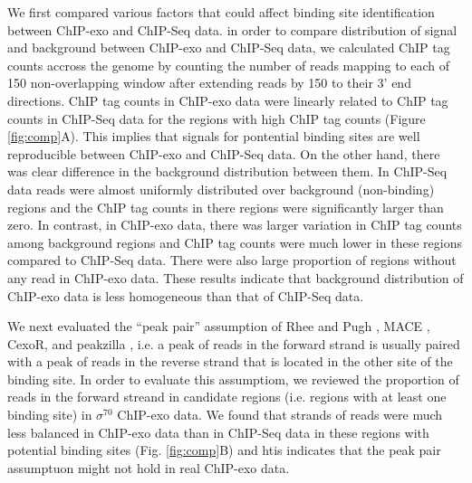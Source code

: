 \documentclass{bmcart}\usepackage[]{graphicx}\usepackage[]{color}
\begin{document}
We first compared various factors that could affect binding site
identification between ChIP-exo and ChIP-Seq data. in order to compare
distribution of signal and background between ChIP-exo and ChIP-Seq
data, we calculated ChIP tag counts accross the genome by counting the
number of reads mapping to each of 150 non-overlapping
window after extending reads by 150 to their 3' end
directions. ChIP tag counts in ChIP-exo data were linearly related to
ChIP tag counts in ChIP-Seq data for the regions with high ChIP tag
counts (Figure \ref{fig:comp}A). This implies that signals for
pontential binding sites are well reproducible between ChIP-exo and
ChIP-Seq data. On the other hand, there was clear difference in the
background distribution between them. In ChIP-Seq data reads were
almost uniformly distributed over background (non-binding) regions and
the ChIP tag counts in there regions were significantly larger than
zero. In contrast, in ChIP-exo data, there was larger variation in
ChIP tag counts among background regions and ChIP tag counts were much
lower in these regions compared to ChIP-Seq data. There were also
large proportion of regions without any read in ChIP-exo data. These
results indicate that background distribution of ChIP-exo data is less
homogeneous than that of ChIP-Seq data.

We next evaluated the ``peak pair'' assumption of Rhee and Pugh
\cite{exo1}, MACE \cite{mace}, CexoR, \cite{cexor} and peakzilla
\cite{peakzilla}, i.e. a peak of reads in the forward strand is
usually paired with a peak of reads in the reverse strand that is
located in the other site of the binding site. In order to evaluate
this assumptiom, we reviewed the proportion of reads in the forward
streand in candidate regions (i.e. regions with at least one binding
site) in $\sigma^{70}$ ChIP-exo data. We found that strands of reads
were much less balanced in ChIP-exo data than in ChIP-Seq data in
these regions with potential binding sites (Fig. \ref{fig:comp}B) and
htis indicates that the peak pair assumptuon might not hold in real
ChIP-exo data.

\end{document}
